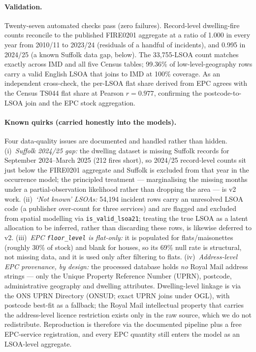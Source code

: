 \paragraph{Validation.}
Twenty-seven automated checks pass (zero failures). Record-level dwelling-fire counts
reconcile to the published FIRE0201 aggregate at a ratio of 1.000 in every year
from 2010/11 to 2023/24 (residuals of a handful of incidents), and 0.995 in
2024/25 (a known Suffolk data gap, below). The 33{,}755-LSOA count matches exactly
across IMD and all five Census tables; 99.36\% of low-level-geography rows carry a
valid English LSOA that joins to IMD at 100\% coverage. As an independent
cross-check, the per-LSOA flat share derived from EPC agrees with the Census TS044
flat share at Pearson $r = 0.977$, confirming the postcode-to-LSOA join and the
EPC stock aggregation.

\paragraph{Known quirks (carried honestly into the models).}
Four data-quality issues are documented and handled rather than hidden.
(i)~\emph{Suffolk 2024/25 gap:} the dwelling dataset is missing Suffolk records for
September 2024--March 2025 (212 fires short), so 2024/25 record-level counts sit
just below the FIRE0201 aggregate and Suffolk is excluded from that year in the
occurrence model; the principled treatment --- marginalising the missing months
under a partial-observation likelihood rather than dropping the area --- is v2
work. (ii)~\emph{`Not known' LSOAs:} 54{,}194 incident rows carry an unresolved
LSOA code (a publisher over-count for three services) and are flagged and excluded
from spatial modelling via \texttt{is\_valid\_lsoa21}; treating the true LSOA as a
latent allocation to be inferred, rather than discarding these rows, is likewise
deferred to v2. (iii)~\emph{EPC \texttt{floor\_level} is flat-only:} it is
populated for flats/maisonettes (roughly 30\% of stock) and blank for houses, so
its 69\% null rate is structural, not missing data, and it is used only after
filtering to flats. (iv)~\emph{Address-level EPC provenance, by design:} the
processed database holds \emph{no} Royal Mail address strings --- only the Unique
Property Reference Number (UPRN), postcode, administrative geography and dwelling
attributes. Dwelling-level linkage is via the ONS UPRN Directory (ONSUD; exact
UPRN joins under OGL), with postcode best-fit as a fallback; the Royal Mail
intellectual property that carries the address-level licence restriction exists
only in the raw source, which we do not redistribute. Reproduction is therefore via
the documented pipeline plus a free EPC-service registration, and every EPC
quantity still enters the model as an LSOA-level aggregate.
